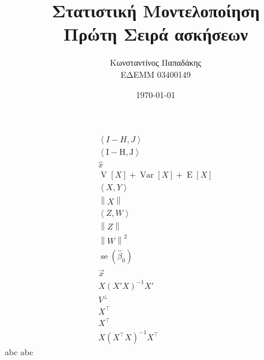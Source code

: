 \documentclass{article}
\title{\textbf{Στατιστική Μοντελοποίηση} \\ Πρώτη Σειρά ασκήσεων}
\author{Κωνσταντίνος Παπαδάκης\\\scriptsize{ΕΔΕΜΜ 03400149}}
\date{\today}
\DeclareMathOperator{\E}{\mathrm{E}}
\DeclareMathOperator{\V}{\mathrm{V}}
\DeclareMathOperator{\Var}{\mathrm{Var}}
\DeclareMathOperator{\se}{\mathrm{se}}
\newcommand{\inner}[2]{\left\langle #1 \mathrel{,} #2 \right\rangle}
\newcommand{\norm}[1]{\left\| #1 \right\|}
\newcommand{\T}[1]{{#1}^{\top}}  %
\begin{document}
\begin{titlepage}
    \maketitle
\end{titlepage}

\begin{gather*}
    \left\langle I - H \mathrel{,} J \right\rangle \\
    \left\langle \mathrm{I} - \mathrm{H} \mathrel{,} \mathrm{J} \right\rangle \\
    \hat{x}\\
    \V[X] + \Var[X] + \E[X]\\
    \inner{X}{Y}\\
    \norm{X}\\
    \inner{Z}{W}\\
    \norm{Z}\\
    \norm{W}^2\\
    \se(\hat{\beta}_0)\\
    \vec{x}\\
    X (X'X)^{-1} X'\\
    V^\bot\\
    X^{\top}\\
    X^{\intercal}\\
    X (\T{X} X)^{-1} \T{X}
\end{gather*}
abc \textlatin{abc}
\end{document}
